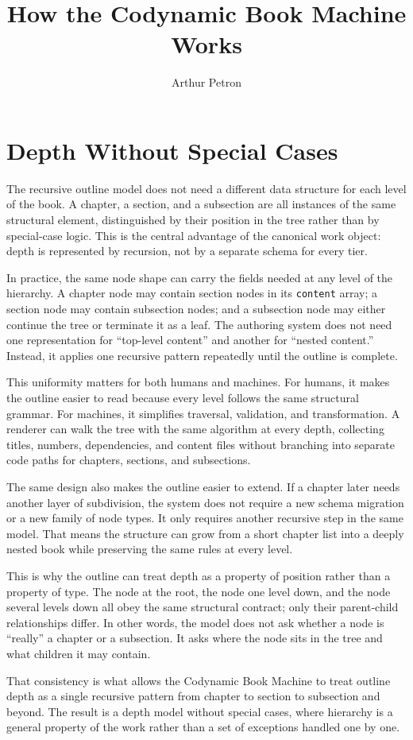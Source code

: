 \documentclass[11pt]{article}
\title{How the Codynamic Book Machine Works}
\author{Arthur Petron}
\begin{document}
\section*{Depth Without Special Cases}

The recursive outline model does not need a different data structure for each level of the book. A chapter, a section, and a subsection are all instances of the same structural element, distinguished by their position in the tree rather than by special-case logic. This is the central advantage of the canonical work object: depth is represented by recursion, not by a separate schema for every tier.

In practice, the same node shape can carry the fields needed at any level of the hierarchy. A chapter node may contain section nodes in its \texttt{content} array; a section node may contain subsection nodes; and a subsection node may either continue the tree or terminate it as a leaf. The authoring system does not need one representation for ``top-level content'' and another for ``nested content.'' Instead, it applies one recursive pattern repeatedly until the outline is complete.

This uniformity matters for both humans and machines. For humans, it makes the outline easier to read because every level follows the same structural grammar. For machines, it simplifies traversal, validation, and transformation. A renderer can walk the tree with the same algorithm at every depth, collecting titles, numbers, dependencies, and content files without branching into separate code paths for chapters, sections, and subsections.

The same design also makes the outline easier to extend. If a chapter later needs another layer of subdivision, the system does not require a new schema migration or a new family of node types. It only requires another recursive step in the same model. That means the structure can grow from a short chapter list into a deeply nested book while preserving the same rules at every level.

This is why the outline can treat depth as a property of position rather than a property of type. The node at the root, the node one level down, and the node several levels down all obey the same structural contract; only their parent-child relationships differ. In other words, the model does not ask whether a node is ``really'' a chapter or a subsection. It asks where the node sits in the tree and what children it may contain.

That consistency is what allows the Codynamic Book Machine to treat outline depth as a single recursive pattern from chapter to section to subsection and beyond. The result is a depth model without special cases, where hierarchy is a general property of the work rather than a set of exceptions handled one by one.
\end{document}
